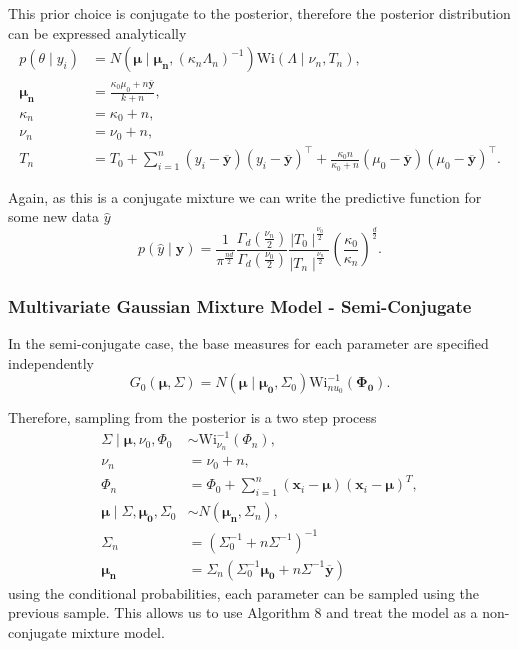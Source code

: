\documentclass[nojss]{jss}
\begin{document}
This prior choice is conjugate to the posterior, therefore the posterior distribution can be expressed analytically
\begin{align*}
p(\theta \mid y_i ) & = N ( \boldsymbol{\mu} \mid \boldsymbol{\mu _n} , (\kappa _n \Lambda _n )^{-1}  ) \text{Wi} (\Lambda \mid \nu _n, T_n), \\
\boldsymbol{\mu _n} & = \frac{\kappa _0 \mu _0 + n \mathbf{\overline{{y}}}}{k + n}, \\
\kappa _n & = \kappa _0 + n, \\
\nu _n & = \nu _0 + n, \\
T_n & = T_0 + \sum _{i=1} ^n (y_i - \mathbf{\overline{{y}}}) ( y_i -  \mathbf{\overline{{y}}} ) ^\top + \frac{\kappa _0 n}{\kappa _0 + n} ( \mu _0 - \mathbf{\overline{{y}}} )( \mu _0 -  \mathbf{\overline{{y}}} ) ^\top.
\end{align*}

Again, as this is a conjugate mixture we can write the predictive function for some new data $\hat{y}$
\begin{equation*}
p(\hat{y} \mid \mathbf{y}  ) = \frac{1}{\pi ^{\frac{nd}{2}}} \frac{\Gamma _d ( \frac{\nu _n}{2})}{\Gamma _d (\frac{\nu _0}{2})}  \frac{\mid T_0 \mid ^ \frac{\nu _0}{2}}{\mid T_n \mid ^ \frac{\nu _n}{2}} \left(  \frac{\kappa _0}{\kappa _n} \right)  ^\frac{d}{2}.
\end{equation*}

\subsubsection{Multivariate Gaussian Mixture Model - Semi-Conjugate}

In the semi-conjugate case, the base measures for each parameter are specified independently
\begin{equation*}
G_0 (\boldsymbol{\mu},  \Sigma) = N(\boldsymbol{\mu} \mid \boldsymbol{\mu _0}, \Sigma _0) \text{Wi}^{-1} _{nu_0} (\boldsymbol{\Phi _0}).
\end{equation*}

Therefore, sampling from the posterior is a two step process
\begin{align*}
\Sigma \mid \boldsymbol{\mu}, \nu _0, \Phi _0 &  \sim \text{Wi} ^{-1} _{\nu_n} (\Phi _n ), \\
\nu _n & = \nu _0 + n, \\
\Phi _n & = \Phi _0 + \sum_{i=1} ^n (\mathbf{x} _i - \boldsymbol{\mu} ) (\mathbf{x} _i - \boldsymbol{\mu} ) ^T, \\
\boldsymbol{\mu} \mid \Sigma , \boldsymbol{\mu _0}, \Sigma _0 & \sim N(\boldsymbol{\mu _n}, \Sigma _n), \\
\Sigma _n & = \left( \Sigma _0 ^{-1} + n \Sigma ^{-1} \right) ^{-1} \\
\boldsymbol{\mu _n} & = \Sigma _n \left( \Sigma _0 ^{-1} \boldsymbol{\mu _0} + n \Sigma ^{-1} \overline{\boldsymbol{y}} \right)
\end{align*}
using the conditional probabilities, each parameter can be sampled using the previous sample. This allows us to use Algorithm 8 and treat the model as a non-conjugate mixture model.
\end{document}
